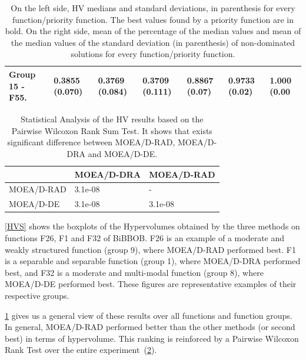 \begin{center}
\begin{table}[!t]
\begin{tabular}{ccccccc}
		\multicolumn{1}{|l|}{Group 15 - F55.}  & \multicolumn{1}{l}{\textbf{0.3855 (0.070)}} & \multicolumn{1}{l}{0.3769 (0.084)} & \multicolumn{1}{l|}{0.3709 (0.111)}  		& \multicolumn{1}{l}{0.8867 (0.07)} & \multicolumn{1}{l}{0.9733 (0.02)} & \multicolumn{1}{l|}{1.000 (0.00} \\ \hline \hline \hline
	\end{tabular}
	\caption{On the left side, HV medians and standard deviations, in parenthesis for every function/priority function. The best values found by a priority function are in bold. On the right side, mean of the percentage of the median values and mean of the median values of the standard deviation (in parenthesis) of non-dominated solutions for every function/priority function.}
	\label{stats}
\end{table}
\end{center}

\begin{table}[!t]
	\begin{tabular}{lll}
		\hline
		\rowcolor[gray]{.7} \multicolumn{1}{|l|}{\textbf{HV}}  & \multicolumn{1}{|l|}{MOEA/D-DRA} & \multicolumn{1}{l|}{MOEA/D-RAD} \\ \hline \hline \hline
		MOEA/D-RAD                      &  3.1e-08                      & -                                      \\
		\rowcolor[gray]{.95} MOEA/D-DE                      &  3.1e-08                   &  3.1e-08                 \\
	\end{tabular}
	\caption{Statistical Analysis of the HV results based on the Pairwise Wilcoxon Rank Sum Test. It shows that exists significant difference between MOEA/D-RAD, MOEA/D-DRA and MOEA/D-DE.}
	\label{statistics}
\end{table}

\ref{HVS} shows the boxplots of the Hypervolumes obtained by the three methods
on functions F26, F1 and F32 of BiBBOB. F26 is an example of a moderate and
weakly structured function (group 9), where MOEA/D-RAD performed best. F1  is a
separable and separable function (group 1), where MOEA/D-DRA performed best, and
F32 is a moderate and multi-modal function (group 8), where MOEA/D-DE performed
best. These figures are representative examples of their respective groups.

\ref{stats} gives us a general view of these results over all functions and
function groups. In general, MOEA/D-RAD performed better than the other methods
(or second best) in terms of hypervolume. This ranking is reinforced by a
Pairwise Wilcoxon Rank Test over the entire experiment~(\ref{statistics}).

